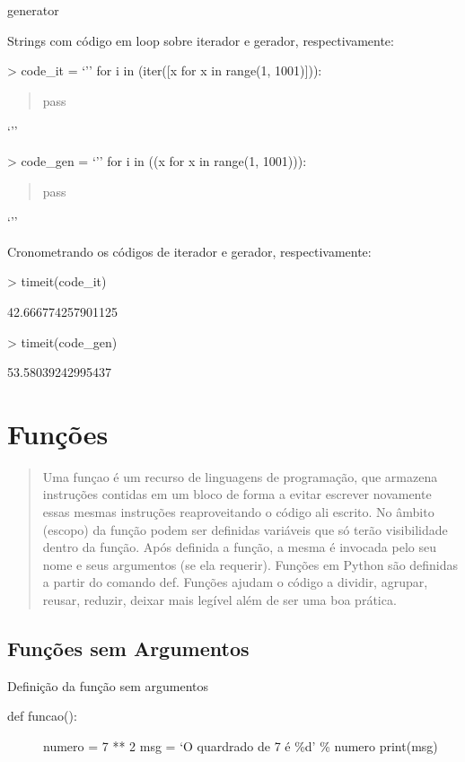 \documentclass[letterpaper,10pt,brazil]{sphinxmanual}
\begin{document}
generator

Strings com código em loop sobre iterador e gerador, respectivamente:

\textgreater{} code\_it = ‘’’
for i in (iter({[}x for x in range(1, 1001){]})):
\begin{quote}

pass
\end{quote}

‘’’

\textgreater{} code\_gen = ‘’’
for i in ((x for x in range(1, 1001))):
\begin{quote}

pass
\end{quote}

‘’’

Cronometrando os códigos de iterador e gerador, respectivamente:

\textgreater{} timeit(code\_it)

42.666774257901125

\textgreater{} timeit(code\_gen)

53.58039242995437


\chapter{Funções}
\label{\detokenize{content/functions:funcoes}}\label{\detokenize{content/functions::doc}}\begin{quote}

Uma funçao é um recurso de linguagens de programação, que armazena instruções contidas em um bloco de forma a evitar escrever novamente essas mesmas instruções reaproveitando o código ali escrito.
No âmbito (escopo) da função podem ser definidas variáveis que só terão visibilidade dentro da função.
Após definida a função, a mesma é invocada pelo seu nome e seus argumentos (se ela requerir).
Funções em Python são definidas a partir do comando def.
Funções ajudam o código a dividir, agrupar, reusar, reduzir, deixar mais legível além de ser uma boa prática.
\end{quote}


\section{Funções sem Argumentos}
\label{\detokenize{content/functions:funcoes-sem-argumentos}}
Definição da função sem argumentos
\begin{description}
\item[{def funcao():}] \leavevmode
numero = 7 ** 2
msg = ‘O quardrado de 7 é \%d’ \% numero
print(msg)

\end{description}
\end{document}
